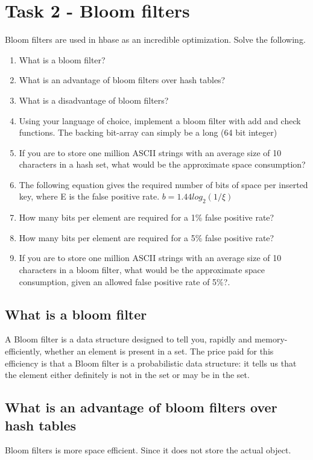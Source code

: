\documentclass{article}
\begin{document}
\section{Task 2 - Bloom filters}
Bloom filters are used in hbase as an incredible optimization. Solve the following.
\begin{enumerate}
    \item What is a bloom filter?
    \item What is an advantage of bloom filters over hash tables?
    \item What is a disadvantage of bloom filters?
    \item Using your language of choice, implement a bloom filter with add and check functions. The backing bit-array can simply be a long (64 bit integer)
    \item If you are to store one million ASCII strings with an average size of 10 characters in a hash set, what would be the approximate space consumption?
    \item The following equation gives the required number of bits of space per inserted key, where E is the false positive rate. \( b = 1.44log_2(1/\xi)\)
    \item How many bits per element are required for a 1\% false positive rate?
    \item How many bits per element are required for a 5\% false positive rate?
    \item If you are to store one million ASCII strings with an average size of 10 characters in a bloom filter, what would be the approximate space consumption, given an allowed false positive rate of 5\%?.

\end{enumerate}

\subsection{What is a bloom filter}
A Bloom filter is a data structure designed to tell you, rapidly and memory-efficiently, 
whether an element is present in a set. The price paid for this efficiency is that a Bloom 
filter is a probabilistic data structure: it tells us that the element either definitely 
is not in the set or may be in the set\cite{bloomfilterbyexample}.

\subsection{What is an advantage of bloom filters over hash tables}
Bloom filters is more space efficient. Since it does not store the actual object.
\end{document}
